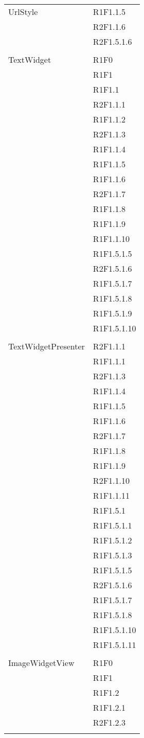 \begin{center}
\begin{longtable}{|p{7cm}|p{5cm}|}
		UrlStyle & R1F1.1.5 \\ & R2F1.1.6 \\ & R2F1.5.1.6 \\ & \\ \hline
		TextWidget & R1F0 \\ & R1F1 \\ & R1F1.1 \\ & R2F1.1.1 \\ & R1F1.1.2 \\ & R2F1.1.3 \\ & R1F1.1.4 \\ & R1F1.1.5 \\ & R1F1.1.6 \\ & R2F1.1.7 \\ & R1F1.1.8 \\ & R1F1.1.9 \\ & R1F1.1.10 \\ & R1F1.5.1.5 \\ & R2F1.5.1.6 \\ & R1F1.5.1.7 \\ & R1F1.5.1.8 \\ & R1F1.5.1.9 \\ & R1F1.5.1.10 \\ & \\ \hline
		TextWidgetPresenter & R2F1.1.1 \\ & R1F1.1.1 \\ & R2F1.1.3 \\ & R1F1.1.4 \\ & R1F1.1.5 \\ & R1F1.1.6 \\ & R2F1.1.7 \\ & R1F1.1.8 \\ & R1F1.1.9 \\ & R2F1.1.10 \\ & R1F1.1.11 \\ & R1F1.5.1 \\ & R1F1.5.1.1 \\ & R1F1.5.1.2 \\ & R1F1.5.1.3 \\ & R1F1.5.1.5 \\ & R2F1.5.1.6 \\ & R1F1.5.1.7 \\ & R1F1.5.1.8 \\ & R1F1.5.1.10 \\ & R1F1.5.1.11 \\ & \\ \hline
		ImageWidgetView & R1F0 \\ & R1F1 \\ & R1F1.2 \\ & R1F1.2.1 \\ & R2F1.2.3 \\ & \\ \hline

\end{longtable}
\end{center}

